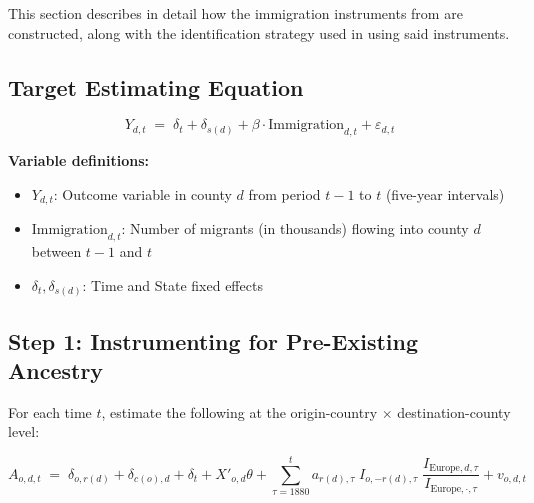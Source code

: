 
    This section describes in detail how the immigration instruments from \cite{MigrantsAncestorsandInvestments} are constructed, along with the identification strategy used in \cite{ImmigrationInnovationGrowth} using said instruments.
\subsection{Target Estimating Equation}

    \begin{equation}\label{eq:target}
     Y_{d,t} \;=\; \delta_t + \delta_{s(d)} + \beta \cdot \text{Immigration}_{d,t} + \varepsilon_{d,t}
    \end{equation}

\noindent\textbf{Variable definitions:}
\begin{itemize}
    \item $Y_{d,t}$: Outcome variable in county $d$ from period $t{-}1$ to $t$ (five-year intervals)
    \item $\text{Immigration}_{d,t}$: Number of migrants (in thousands) flowing into county $d$ between $t{-}1$ and $t$
    \item $\delta_t, \delta_{s(d)}$: Time and State fixed effects
\end{itemize}


\subsection{Step 1: Instrumenting for Pre-Existing Ancestry}

For each time $t$, estimate the following at the origin-country $\times$ destination-county level:

\begin{equation}\label{eq:step1}
A_{o,d,t} \;=\; \delta_{o,r(d)} + \delta_{c(o),d} + \delta_t + X'_{o,d}\theta
+ \sum_{\tau=1880}^{t} a_{r(d),\tau}\; I_{o,-r(d),\tau}\;\frac{I_{\text{Europe},d,\tau}}{I_{\text{Europe},\cdot,\tau}}
+ v_{o,d,t}
\end{equation}

